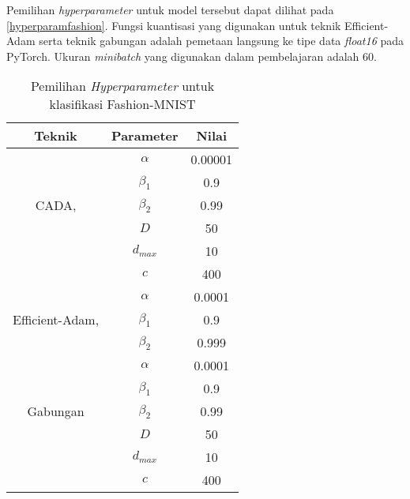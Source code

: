 Pemilihan \emph{hyperparameter} untuk model tersebut dapat dilihat pada \autoref{hyperparamfashion}. Fungsi kuantisasi yang digunakan untuk teknik Efficient-Adam serta teknik gabungan adalah pemetaan langsung ke tipe data \emph{float16} pada PyTorch. Ukuran \emph{minibatch} yang digunakan dalam pembelajaran adalah 60.

\begin{table}[H]
  \caption{Pemilihan \emph{Hyperparameter} untuk klasifikasi Fashion-MNIST}\label{hyperparamfashion}
  \centering
  \begin{tabular}{ | c | c | c | }
    \hline
    \textbf{Teknik}                                               & \textbf{Parameter} & \textbf{Nilai} \\
    \hline
    \multirow{5}{*}{CADA, \textcite{Chen2021CADA}}                & $\alpha$           & 0.00001        \\
                                                                  & $\beta_1$          & 0.9            \\
                                                                  & $\beta_2$          & 0.99           \\
                                                                  & $D$                & 50             \\
                                                                  & $d_{max}$          & 10             \\
                                                                  & $c$                & 400            \\
    \hline
    \multirow{3}{*}{Efficient-Adam, \textcite{Chen2022Efficient}} & $\alpha$           & 0.0001         \\
                                                                  & $\beta_1$          & 0.9            \\
                                                                  & $\beta_2$          & 0.999          \\
    \hline
    \multirow{5}{*}{Gabungan}                                     & $\alpha$           & 0.0001         \\
                                                                  & $\beta_1$          & 0.9            \\
                                                                  & $\beta_2$          & 0.99           \\
                                                                  & $D$                & 50             \\
                                                                  & $d_{max}$          & 10             \\
                                                                  & $c$                & 400            \\
    \hline
  \end{tabular}
\end{table}


